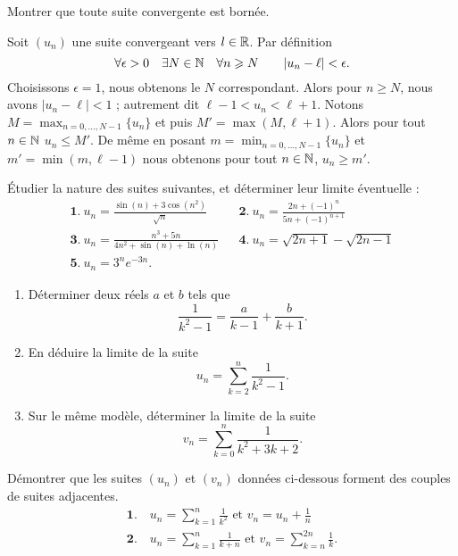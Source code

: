 \documentclass{book}
\begin{document}
\begin{Exercice}
 Montrer que toute suite convergente est bornée.
\begin{Correction}
Soit $(u_n)$ une suite convergeant vers $l \in \mathbb{R}$. Par
d\'efinition
$$\forall \epsilon > 0 \quad \exists N \in \mathbb{N} \quad  \forall n\geqslant N \qquad |u_n-\ell| < \epsilon.$$
Choisissons $\epsilon = 1$, nous obtenons le  $N$ correspondant.
Alors pour $n\geqslant N$, nous avons $|u_n-\ell| < 1$ ; 
autrement dit $\ell -1 <
u_n < \ell + 1$. Notons $M = \max_{n=0,\ldots,N-1}  \{u_n\}$  et
puis $ M' = \max (M,\ell+1)$. Alors  pour tout $n \in \mathbb{N}$ $u_n
\leq M'$. De m\^eme en posant $m = \min_{n=0,\ldots,N-1} \{u_n\}$ et
$m' = \min(m,\ell -1)$ nous obtenons pour tout $n\in \mathbb{N}$, $u_n
\geq m'$.
\end{Correction}
\end{Exercice}
\begin{Exercice}[Nature]
\'Etudier la nature des suites suivantes, et déterminer leur limite éventuelle :
$$\begin{array}{lcl}
\displaystyle \mathbf 1.\ u_n=\frac{\sin(n)+3\cos\left(n^2\right)}{\sqrt{n}}&&\displaystyle \mathbf 2.\ u_n=\frac{2n+(-1)^n}{5n+(-1)^{n+1}}\\
\displaystyle \mathbf 3.\ u_n=\frac{n^3+5n}{4n^2+\sin(n)+\ln(n)}&&\displaystyle \mathbf 4.\ u_n=
\sqrt{2n+1}-\sqrt{2n-1}\\
\displaystyle \mathbf 5.\ u_n=3^ne^{-3n}.
\end{array}$$
\end{Exercice}
\begin{Exercice}
\begin{enumerate}
\item Déterminer deux réels $a$ et $b$ tels que
$$\frac{1}{k^2-1}=\frac{a}{k-1}+\frac{b}{k+1}.$$
\item En déduire la limite de la suite 
$$u_n=\sum_{k=2}^n \frac{1}{k^2-1}.$$
\item Sur le même modèle, déterminer la limite de la suite 
$$v_n=\sum_{k=0}^n\frac{1}{k^2+3k+2}.$$
\end{enumerate}
\end{Exercice}

\begin{Exercice}
Démontrer que les suites $(u_n)$ et $(v_n)$ données ci-dessous forment
des couples de suites adjacentes.
$$
\begin{array}{ll}
\mathbf{1.}\quad \displaystyle u_n=\sum_{k=1}^n \frac1{k^2}\textrm{ et }v_n=u_n+\frac 1n\\
\mathbf{2.}\quad \displaystyle u_n=\sum_{k=1}^n\frac{1}{k+n}\textrm{ et }v_n=\sum_{k=n}^{2n}\frac 1k.
\end{array}$$
\end{Exercice}
\end{document}
